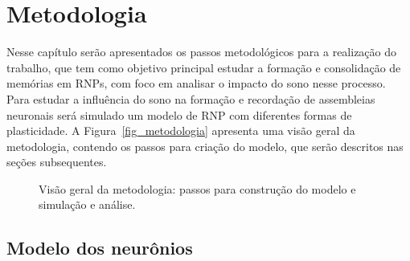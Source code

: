 \chapter{Metodologia}

Nesse capítulo serão apresentados os passos metodológicos para a realização do trabalho, que tem como objetivo principal estudar a
formação e consolidação de memórias em RNPs, com foco em analisar o impacto do sono nesse processo. Para estudar a influência do
sono na formação e recordação de assembleias neu\-ro\-nais será simulado um modelo de RNP com diferentes formas de plasticidade. A
Figura~\ref{fig_metodologia} apresenta uma visão geral da metodologia, contendo os passos para criação do modelo, que serão
descritos nas seções subsequentes.

\begin{figure}[!ht]
\caption{Visão geral da metodologia: passos para construção do modelo e simulação e análise.}
\end{figure}


\section{Modelo dos neurônios}

